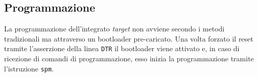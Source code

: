 \subsection{Programmazione}

La programmazione dell'integrato \textit{target} non avviene secondo i metodi tradizionali ma attraverso un bootloader pre-caricato\cite[bootloaders/atmega/ATmegaBOOT\_168.c]{git:arduinocore}. 
Una volta forzato il reset tramite l'asserzione della linea \texttt{DTR} il bootloader viene attivato e, in caso di ricezione di comandi di programmazione, esso inizia la programmazione tramite l'istruzione \texttt{spm}.

